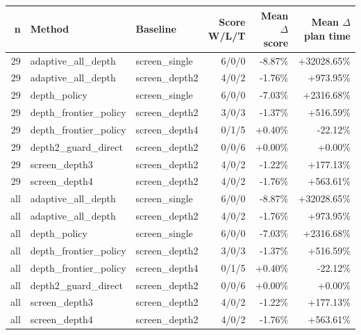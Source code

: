\begin{tabular}{rllrrr}
\toprule
n & Method & Baseline & Score W/L/T & Mean $\Delta$ score & Mean $\Delta$ plan time \\
\midrule
29 & adaptive\_all\_depth & screen\_single & 6/0/0 & -8.87\% & +32028.65\% \\
29 & adaptive\_all\_depth & screen\_depth2 & 4/0/2 & -1.76\% & +973.95\% \\
29 & depth\_policy & screen\_single & 6/0/0 & -7.03\% & +2316.68\% \\
29 & depth\_frontier\_policy & screen\_depth2 & 3/0/3 & -1.37\% & +516.59\% \\
29 & depth\_frontier\_policy & screen\_depth4 & 0/1/5 & +0.40\% & -22.12\% \\
29 & depth2\_guard\_direct & screen\_depth2 & 0/0/6 & +0.00\% & +0.00\% \\
29 & screen\_depth3 & screen\_depth2 & 4/0/2 & -1.22\% & +177.13\% \\
29 & screen\_depth4 & screen\_depth2 & 4/0/2 & -1.76\% & +563.61\% \\
all & adaptive\_all\_depth & screen\_single & 6/0/0 & -8.87\% & +32028.65\% \\
all & adaptive\_all\_depth & screen\_depth2 & 4/0/2 & -1.76\% & +973.95\% \\
all & depth\_policy & screen\_single & 6/0/0 & -7.03\% & +2316.68\% \\
all & depth\_frontier\_policy & screen\_depth2 & 3/0/3 & -1.37\% & +516.59\% \\
all & depth\_frontier\_policy & screen\_depth4 & 0/1/5 & +0.40\% & -22.12\% \\
all & depth2\_guard\_direct & screen\_depth2 & 0/0/6 & +0.00\% & +0.00\% \\
all & screen\_depth3 & screen\_depth2 & 4/0/2 & -1.22\% & +177.13\% \\
all & screen\_depth4 & screen\_depth2 & 4/0/2 & -1.76\% & +563.61\% \\
\bottomrule
\end{tabular}
